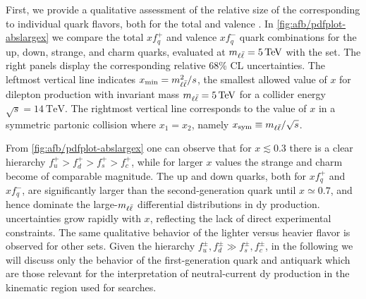 First, we provide a qualitative assessment of the relative size of the \pdfs
corresponding to individual quark flavors, both for the total and valence
\pdfs.
In \cref{fig:afb/pdfplot-abslargex} we compare the total $xf^+_q$ and valence
$xf_q^-$ quark \pdf combinations for the up, down, strange, and charm quarks,
evaluated at $\mll=\SI{5}{\tera\electronvolt}$ with the  \nnlo \pdf
set.
%
The right panels display the corresponding relative 68\% CL uncertainties.
%
The leftmost vertical line indicates $x_{\text{min}}=m_{\ell\bar{\ell}}^2/s$, the smallest
allowed value of $x$  for dilepton \dy production with invariant mass
$\mll=\SI{5}{\tera\electronvolt}$ for a collider \com energy
$\sqrt{s}=\SI{14}{\tera\electronvolt}$.
%
The rightmost vertical line corresponds to
the value of $x$ in a symmetric partonic collision where $x_1=x_2$, namely
$x_{\text{sym}}\equiv m_{\ell\bar{\ell}}/\sqrt{s}$.

   From \cref{fig:afb/pdfplot-abslargex} one can observe that for
   $x\lesssim 0.3$ there is a clear hierarchy
$f_u^+>f_d^+ >f_s^+>f_c^+$, while for larger $x$ values the
   strange and charm \pdfs become of comparable magnitude.
   The up and down quarks, both for $xf^+_q$ and $xf^-_q$, are significantly larger
   than the second-generation quark \pdfs until $x\simeq 0.7$, and hence dominate the
   large-$m_{\ell\bar{\ell}}$ differential distributions in \acrlong{dy} production.
%
\pdf uncertainties grow rapidly with $x$, reflecting the lack
of direct experimental constraints.
%
The same qualitative behavior of the lighter versus heavier flavor \pdfs
is observed for other \pdf sets.
%
Given the hierarchy $f_u^\pm, f_d^\pm \gg f_s^\pm, f_c^\pm $, in the following
we will discuss only the behavior of the first-generation quark
and antiquark \pdfs which are those relevant for the interpretation
of neutral-current \acrlong{dy} production in the kinematic region used
for \bsm searches. 
      


